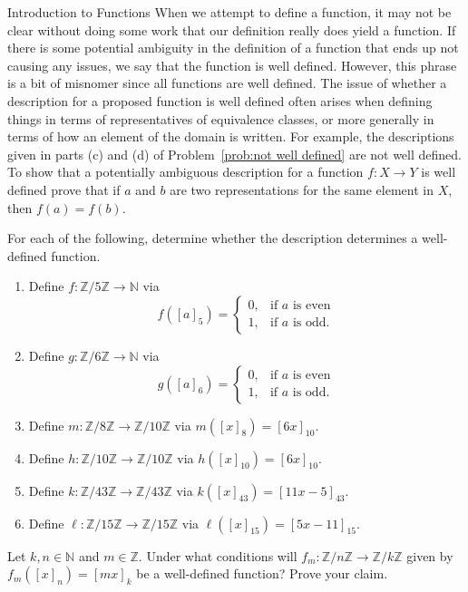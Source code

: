 \begin{section}{Introduction to Functions}
When we attempt to define a function, it may not be clear without doing some work that our definition really does yield a function. If there is some potential ambiguity in the definition of a function that ends up not causing any issues, we say that the function is well defined. However, this phrase is a bit of misnomer since all functions are well defined. The issue of whether a description for a proposed function is well defined often arises when defining things in terms of representatives of equivalence classes, or more generally in terms of how an element of the domain is written.  For example, the descriptions given in parts (c) and (d) of Problem~\ref{prob:not well defined} are not well defined.  To show that a potentially ambiguous description for a function $f:X\to Y$ is well defined prove that if $a$ and $b$ are two representations for the same element in $X$, then $f(a)=f(b)$.

\begin{problem}\label{prob:well defined}
For each of the following, determine whether the description determines a well-defined function.
\begin{enumerate}[label=\textrm{(\alph*)}]
\item Define $f:\mathbb{Z}/5\mathbb{Z}\to \mathbb{N}$ via
\[
f([a]_5)=\begin{cases}
0, & \mbox{if } a\mbox{ is even}\\
1, & \mbox{if } a\mbox{ is odd}.
\end{cases}
\]
\item Define $g:\mathbb{Z}/6\mathbb{Z}\to \mathbb{N}$ via
\[
g([a]_6)=\begin{cases}
0, & \mbox{if } a\mbox{ is even}\\
1, & \mbox{if } a\mbox{ is odd}.
\end{cases}
\]
\item\label{mod 8 to mod 10} Define $m:\mathbb{Z}/8\mathbb{Z}\to \mathbb{Z}/10\mathbb{Z}$ via $m([x]_{8})=[6x]_{10}$.
\item\label{mod 10 to mod 10} Define $h:\mathbb{Z}/10\mathbb{Z}\to \mathbb{Z}/10\mathbb{Z}$ via $h([x]_{10})=[6x]_{10}$.
\item\label{mod 43 to mod 43} Define $k:\mathbb{Z}/43\mathbb{Z}\to \mathbb{Z}/43\mathbb{Z}$ via $k([x]_{43})=[11x-5]_{43}$.
\item\label{mod 15 to mod 15} Define $\ell:\mathbb{Z}/15\mathbb{Z}\to \mathbb{Z}/15\mathbb{Z}$ via $\ell([x]_{15})=[5x-11]_{15}$.
\end{enumerate}
\end{problem}

\begin{problem}
Let $k,n\in\mathbb{N}$ and $m\in\mathbb{Z}$. Under what conditions will $f_m: \mathbb{Z}/n\mathbb{Z}\to \mathbb{Z}/k\mathbb{Z}$ given by $f_m([x]_n) = [mx]_k$ be a well-defined function?  Prove your claim.
\end{problem}

\end{section}